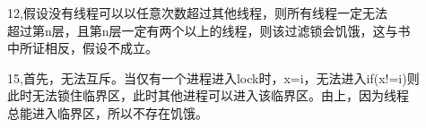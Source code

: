 \documentclass[UTF8]{ctexart}
\begin{document}
    
    12,假设没有线程可以以任意次数超过其他线程，则所有线程一定无法\\
    超过第n层，且第n层一定有两个以上的线程，则该过滤锁会饥饿，这与书\\
    中所证相反，假设不成立。

    15,首先，无法互斥。当仅有一个进程进入lock时，x=i，无法进入if(x!=i)则\\
    此时无法锁住临界区，此时其他进程可以进入该临界区。由上，因为线程\\
    总能进入临界区，所以不存在饥饿。
\end{document}
